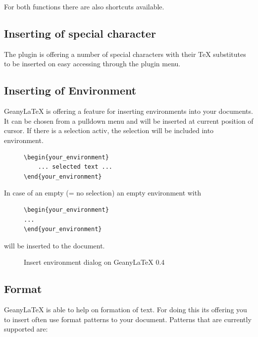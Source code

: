 \documentclass[%
a4paper,%
10pt,%
oneside,%
DIV18,
headsepline,
plainheadsepline,
footsepline,
plainfootsepline,
bibtotoc,%
liststotoc,%
BCOR12mm,%
halfparskip,%
openany,%
]{scrartcl}
\begin{document}
For both functions there are also shortcuts available.

\subsection{Inserting of special character}
The plugin is offering a number of special characters with their \TeX{}
substitutes to be inserted on easy accessing through the plugin menu.

\subsection{Inserting of Environment}
Geany\LaTeX{} is offering a feature for inserting environments into your
documents. It can be chosen from a pulldown menu and will be inserted at
current position of cursor. If there is a selection activ, the selection
will be included into environment.

\begin{figure}[h!]
\begin{lstlisting}
\begin{your_environment}
	... selected text ...
\end{your_environment}
\end{lstlisting}
\end{figure}

In case of an empty (= no selection) an empty environment with
\begin{figure}[h!]
\begin{lstlisting}
\begin{your_environment}
...
\end{your_environment}
\end{lstlisting}
\end{figure}

will be inserted to the document.

\begin{figure}[h!]
	\caption{Insert environment dialog on Geany\LaTeX{} 0.4}
\end{figure}


\subsection{Format}
Geany\LaTeX{} is able to help on formation of text. For doing this its
offering you to insert often use format patterns to your document.
Patterns that are currently supported are:
\end{document}
